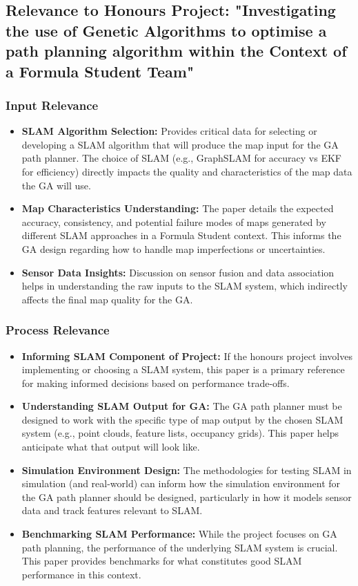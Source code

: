 \subsection{Relevance to Honours Project: "Investigating the use of Genetic Algorithms to optimise a path planning algorithm within the Context of a Formula Student Team"}\label{subsec:relevance-to-honours-project:-"investigating-the-use-of-genetic-algorithms-to-optimise-a-path-planning-algorithm-within-the-context-of-a-formula-student-team"3}

\subsubsection{Input Relevance}
\begin{itemize}
    \item \textbf{SLAM Algorithm Selection:} Provides critical data for selecting or developing a SLAM algorithm that will produce the map input for the GA path planner.
    The choice of SLAM (e.g., GraphSLAM for accuracy vs EKF for efficiency) directly impacts the quality and characteristics of the map data the GA will use.
    \item \textbf{Map Characteristics Understanding:} The paper details the expected accuracy, consistency, and potential failure modes of maps generated by different SLAM approaches in a Formula Student context.
    This informs the GA design regarding how to handle map imperfections or uncertainties.
    \item \textbf{Sensor Data Insights:} Discussion on sensor fusion and data association helps in understanding the raw inputs to the SLAM system, which indirectly affects the final map quality for the GA.
\end{itemize}

\subsubsection{Process Relevance}
\begin{itemize}
    \item \textbf{Informing SLAM Component of Project:} If the honours project involves implementing or choosing a SLAM system, this paper is a primary reference for making informed decisions based on performance trade-offs.
    \item \textbf{Understanding SLAM Output for GA:} The GA path planner must be designed to work with the specific type of map output by the chosen SLAM system (e.g., point clouds, feature lists, occupancy grids). This paper helps anticipate what that output will look like.
    \item \textbf{Simulation Environment Design:} The methodologies for testing SLAM in simulation (and real-world) can inform how the simulation environment for the GA path planner should be designed, particularly in how it models sensor data and track features relevant to SLAM.
    \item \textbf{Benchmarking SLAM Performance:} While the project focuses on GA path planning, the performance of the underlying SLAM system is crucial. This paper provides benchmarks for what constitutes good SLAM performance in this context.
\end{itemize}

